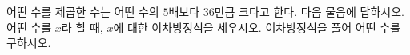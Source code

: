 어떤 수를 제곱한 수는 어떤 수의 $5$배보다 $36$만큼 크다고 한다. 다음 물음에 답하시오.
 어떤 수를 $x$라 할 때, $x$에 대한 이차방정식을 세우시오.
 이차방정식을 풀어 어떤 수를 구하시오.
